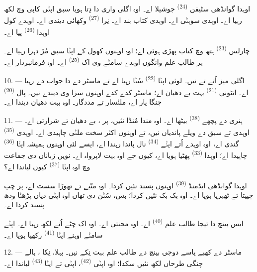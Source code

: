 اوہدا گوانڈھی سٹیفن \textsuperscript{(24)} جوشیلا اے۔ اوہ اگلی واری دا دِتا ہویا
سبق اپݨی کاپی وچ لکھ رہیا اے۔ اوہدی  سوہݨی اے۔ اوہدی کتاب بند
اے۔ نِرا  \textsuperscript{(27)} وکھائی دیندی اے۔ اوہدے کول اوہدا
 \textsuperscript{(26)} پیا اے۔

چارلس \textsuperscript{(23)} ہتھ وچ کتاب پھڑی ہوئی اے؛ اوہ اوہنوں کھول کے اپݨا
سبق مُڑ دہرا رہیا اے۔ ہر طالب علم وانگوں اوہدے سامݨے وی اک 
\textsuperscript{(25)} اے۔ اوہ فرمانبردار اے۔

10. --- اگلی میز اُتے  تے  نیں۔ لوئی اپݨا
 \textsuperscript{(22)} سُݨا رہیا اے تے ماسٹر دے  دا
جواب دے رہیا اے۔ انٹونی \textsuperscript{(21)} بہت بے دھیان اے؛ ماسٹر کدے کدے
اوہنوں سزا وی دیندے نیں۔ پال \textsuperscript{(20)} چنگا یار اے، ملݨسار تے
مددگار۔ اوہ بہت دھیان دیندا اے۔

\VUsaut{4.2mm}
\VUsaut{3.2mm}

11. --- ہنری دے پچھے  \textsuperscript{(38)} بیٹھا اے۔ اوہ مندا مُنڈا
نئیں، پر ، بے دھیان تے شرارتی اے۔ اوہدی  تے
 سبق دے ویلے  پاندیاں نیں، تے اوہنوں اکثر سخت
 ملݨی چاہیدی اے۔ اوہدی  \textsuperscript{(35)}
گندی اے، اوہ اوہدے اُتے اپݨے  \textsuperscript{(34)} نال
 پاندا رہندا اے، ایسے لئی اوہنوں ہمیشہ اپݨا 
\textsuperscript{(36)} چاہیدا اے؛ اوہدا  \textsuperscript{(33)} پھٹیا
ہویا اے، کیوں جے اوہ بہت لاپرواہ اے۔ نویں زباناں دی جماعت وچ اوہ اپݨا
 \textsuperscript{(37)} کیوں لیاندا اے؟

اوہدا گوانڈھی ایڈمنڈ \textsuperscript{(39)} اوہنوں پسند نئیں کردا۔ اوہ منّیے تے
تھوڑا سست اے، پر چپ چپیتا تے ٹھہریا ہویا اے۔ اوہ بک بک نئیں کردا؛ بس، سُݨن دی
تھاں اوہ اپݨی  دیاں  پڑھݨا ودھ پسند کردا اے۔

ایس بینچ دا تیجا طالب علم  \textsuperscript{(40)} اے۔ اوہ محنتی اے۔
اوہ  اک چٹے  اُتے لکھ رہیا اے۔ اپݨے سامݨے اوہنے
اپݨا  \textsuperscript{(41)} رکھیا ہویا اے۔

12. --- ماسٹر دے کھبے پاسے دوجی بینچ دے طالب علم بہت نِکے نیں۔ پہلا، نِکا
، ہالے چنگی طرحاں لکھ نئیں سکدا؛ اوہ اپݨی 
\textsuperscript{(42)}، اپݨی  تے اپݨا 
\textsuperscript{(43)} لیاندا اے۔

